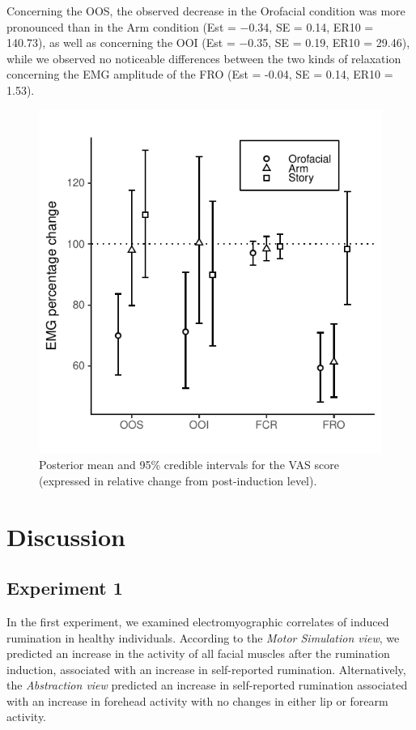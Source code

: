 \documentclass[a4paper,12pt,twoside,openright,oldfontcommands]{memoir}
\begin{document}
Concerning the OOS, the observed decrease in the Orofacial condition was
more pronounced than in the Arm condition (Est = −0.34, SE = 0.14, ER10
= 140.73), as well as concerning the OOI (Est = −0.35, SE = 0.19, ER10 =
29.46), while we observed no noticeable differences between the two
kinds of relaxation concerning the EMG amplitude of the FRO (Est =
-0.04, SE = 0.14, ER10 = 1.53).

\begin{figure}

{\centering \includegraphics[width=0.75\linewidth]{assets/emg_fig3} 

}

\caption{Posterior mean and 95\% credible intervals for the VAS score (expressed in relative change from post-induction level).}\label{fig:resultsemgfig3}
\end{figure}

\section{Discussion}\label{discussion}

\subsection{Experiment 1}\label{experiment-1}

In the first experiment, we examined electromyographic correlates of
induced rumination in healthy individuals. According to the \emph{Motor
Simulation view}, we predicted an increase in the activity of all facial
muscles after the rumination induction, associated with an increase in
self-reported rumination. Alternatively, the \emph{Abstraction view}
predicted an increase in self-reported rumination associated with an
increase in forehead activity with no changes in either lip or forearm
activity.
\end{document}
